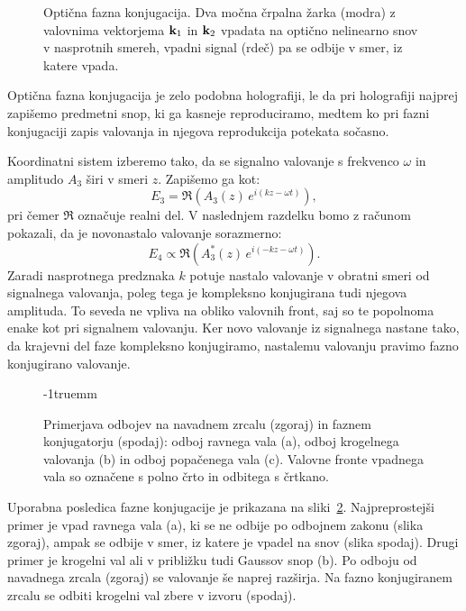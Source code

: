 \begin{figure}[ht]
\centering
\def\svgwidth{60truemm} 

\caption{Optična fazna konjugacija. Dva močna črpalna žarka (modra) z valovnima
vektorjema ${\bf k}_{1}$ in ${\bf k}_2$ vpadata na optično nelinearno snov v 
nasprotnih smereh, vpadni signal (rdeč) pa se odbije v 
smer, iz katere vpada.}
\label{08_OPC1}
\end{figure}

\begin{remark}Optična fazna konjugacija je zelo podobna holografiji, 
le da pri holografiji najprej zapišemo predmetni snop, ki ga kasneje reproduciramo, 
medtem ko pri fazni konjugaciji zapis valovanja in njegova reprodukcija 
potekata sočasno. 
\end{remark}

Koordinatni sistem izberemo tako, da se signalno valovanje s frekvenco $\omega$ in amplitudo $A_3$
širi v smeri $z$. Zapišemo ga kot:
\begin{equation}
E_{3}=\mathfrak{\Re}\left(A_3\left(z\right)\, e^{i\left(kz-\omega t\right)}\right)\!\!,
\label{8.97}
\end{equation}
pri čemer $\mathfrak{\Re}$ označuje realni del. 
V naslednjem razdelku bomo z računom pokazali, da je novonastalo valovanje sorazmerno:
\begin{equation}
E_{4} \propto \mathfrak{\Re}\left(A_3^{*}\left(z\right)\, e^{i\left(-kz-\omega t\right)}\right)\!\!.
\label{8.98}
\end{equation}
Zaradi nasprotnega predznaka $k$ potuje nastalo valovanje v obratni smeri od signalnega
valovanja, poleg tega je kompleksno konjugirana tudi njegova amplituda. To seveda
ne vpliva na obliko valovnih front, saj so te popolnoma enake kot pri signalnem
valovanju. Ker novo valovanje iz signalnega nastane tako,
da krajevni del faze kompleksno konjugiramo, nastalemu valovanju pravimo fazno
konjugirano valovanje.

\begin{figure}[ht]
\centering
\def\svgwidth{100truemm} 

\caption{Primerjava odbojev na navadnem zrcalu (zgoraj) in faznem konjugatorju (spodaj): odboj ravnega
vala (a), odboj krogelnega valovanja (b) in odboj popačenega vala (c). Valovne fronte 
vpadnega vala so označene s polno črto in odbitega s črtkano.}
\label{08_OPC2}
\vglue-1truemm
\end{figure}
Uporabna posledica fazne konjugacije je prikazana na sliki~\ref{08_OPC2}.
Najpreprostejši primer je vpad ravnega vala (a), ki se ne odbije po 
odbojnem zakonu (slika zgoraj), ampak se odbije v smer, iz katere 
je vpadel na snov (slika spodaj). Drugi primer je krogelni val 
ali v približku tudi Gaussov snop (b). Po odboju od navadnega zrcala (zgoraj) se 
valovanje še naprej razširja. Na fazno konjugiranem zrcalu se odbiti krogelni val 
zbere v izvoru (spodaj). 

